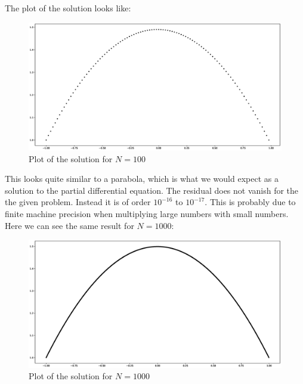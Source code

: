 \documentclass{scrartcl}
\begin{document}
The plot of the solution looks like:
\begin{figure}[!h]
	\centering
	\includegraphics[width=0.8\linewidth]{Plots/forwardbackward100.eps}
	\caption{Plot of the solution for \(N=100\)}
	\label{fig:forwardbackwardplot100}
\end{figure}
This looks quite similar to a parabola, which is what we would expect as a solution to the partial differential equation.
The residual does not vanish for the the given problem. Instead it is of order \( 10^{-16} \) to \( 10^{-17} \). This is probably due to finite machine precision when multiplying large numbers with small numbers.
Here we can see the same result for \(N=1000\):
\begin{figure}[!h]
	\centering
	\includegraphics[width=0.8\linewidth]{Plots/forwardbackward1000.eps}
	\caption{Plot of the solution for \(N=1000\)}
	\label{fig:forwardbackwardplot1000}
\end{figure}
\end{document}
